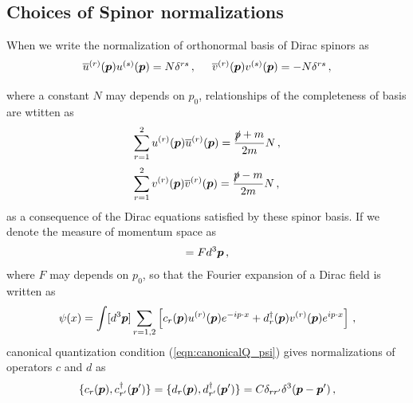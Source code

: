 \subsection{Choices of Spinor normalizations }
When we write the normalization of orthonormal basis of Dirac spinors as
\begin{eqnarray}
\begin{array}{c}
\overline{u}^{(r)}(\bld{p})
u^{(s)}(\bld{p})
= N \delta^{rs}\,,
\hspace{5mm}
\overline{v}^{(r)}(\bld{p})
v^{(s)}(\bld{p})
= -N \delta^{rs}\,,
\vspace{2mm}
\end{array}
\label{eqn:ArbitraryDiracspinorNormalization}
\end{eqnarray}
where a constant $N$ may depends on $p_0$,
relationships of the completeness of basis are wtitten as
\begin{eqnarray}
\begin{array}{l}
\displaystyle
\sum_{r=1}^2 u^{(r)}(\bld{p}) 
\overline{u}^{(r)}(\bld{p})
=
\frac{\slashed{p} + m}{2m}N\,,
\vspace{2mm}
\\
\displaystyle
\sum_{r=1}^2 v^{(r)}(\bld{p}) 
\overline{v}^{(r)}(\bld{p})
=
\frac{\slashed{p} - m}{2m}N\,,
\end{array}
\label{eqn:DiracspinorPolSumforN}
\end{eqnarray}
as a consequence of the Dirac equations satisfied by these spinor basis.
If we denote the measure of momentum space as
\begin{eqnarray}
[ d^3 \bld{p} ] = F d^3 \bld{p}\,,
\label{eqn:MeasureMomSp}
\end{eqnarray}
where $F$ may depends on $p_0$, so that the Fourier expansion of a Dirac field is written as
\begin{equation}
\psi(x) 
=
\int [ d^3 \mbox{\boldmath $p$} ]
\sum_{r = 1,2}
\left[
c_r(\mbox{\boldmath $p$}) u^{(r)}(\mbox{\boldmath $p$}) e^{-ip \cdot x}
+
d_r^\dagger(\mbox{\boldmath $p$}) v^{(r)}(\mbox{\boldmath $p$}) e^{ip \cdot x}
\right]\,,
\label{eqn:DiracFourierArbMeasure}
\end{equation}
canonical quantization condition (\ref{eqn:canonicalQ_psi}) gives
normalizations of operators $c$ and $d$ as
\begin{equation}
\{ c_{r}(\mbox{\boldmath $p$}), c_{r'}^\dagger(\mbox{\boldmath $p$}') \}
=
\{ d_{r}(\mbox{\boldmath $p$}), d_{r'}^\dagger(\mbox{\boldmath $p$}') \}
=
C \delta_{rr'} 
\delta^3(\mbox{\boldmath $p$} - \mbox{\boldmath $p$}')\,,
\label{eqn:Dirc_creann_with_C}
\end{equation}
